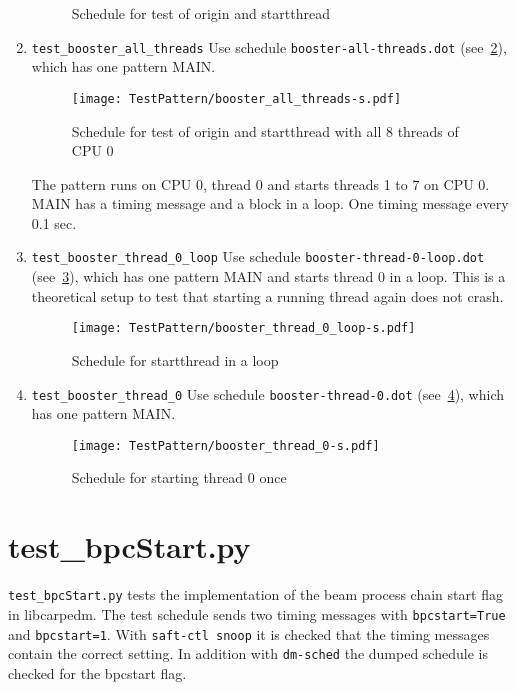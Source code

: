 \documentclass[12pt,a4paper]{report}
\begin{document}
\begin{enumerate}
\begin{figure}
        \caption{Schedule for test of origin and startthread}
        \label{fig:Schedule_booster_startthread-3}
    \end{figure}
\item \texttt{test\_booster\_all\_threads}
Use schedule \texttt{booster-all-threads.dot} (see~\ref{fig:Schedule_booster_all_threads}),
which has one pattern MAIN.
    \begin{figure}
        \centering
        \texttt{[image: TestPattern/booster\_all\_threads-s.pdf]}
        \caption{Schedule for test of origin and startthread with all 8 threads of CPU 0}
        \label{fig:Schedule_booster_all_threads}
    \end{figure}
The pattern runs on CPU 0, thread 0 and starts threads 1 to 7 on CPU 0.
MAIN has a timing message and a block in a loop. One timing message every 0.1 sec.
\item \texttt{test\_booster\_thread\_0\_loop}
Use schedule \texttt{booster-thread-0-loop.dot} (see~\ref{fig:Schedule_booster_thread_0_loop}),
which has one pattern MAIN and starts thread 0 in a loop. This is a
theoretical setup to test that starting a running thread again does not
crash.
    \begin{figure}
        \centering
        \texttt{[image: TestPattern/booster\_thread\_0\_loop-s.pdf]}
        \caption{Schedule for startthread in a loop}
        \label{fig:Schedule_booster_thread_0_loop}
    \end{figure}
\item \texttt{test\_booster\_thread\_0}
Use schedule \texttt{booster-thread-0.dot} (see~\ref{fig:Schedule_booster_thread_0}),
which has one pattern MAIN.
    \begin{figure}
        \centering
        \texttt{[image: TestPattern/booster\_thread\_0-s.pdf]}
        \caption{Schedule for starting thread 0 once}
        \label{fig:Schedule_booster_thread_0}
    \end{figure}
\end{enumerate}

\section{test\_bpcStart.py}
\texttt{test\_bpcStart.py} tests the implementation of the beam process chain start flag in libcarpedm.
The test schedule sends two timing messages with \texttt{bpcstart=True} and \texttt{bpcstart=1}.
With \texttt{saft-ctl snoop} it is checked that the timing messages contain the correct setting.
In addition with \texttt{dm-sched} the dumped schedule is checked for the bpcstart flag.
\end{document}
